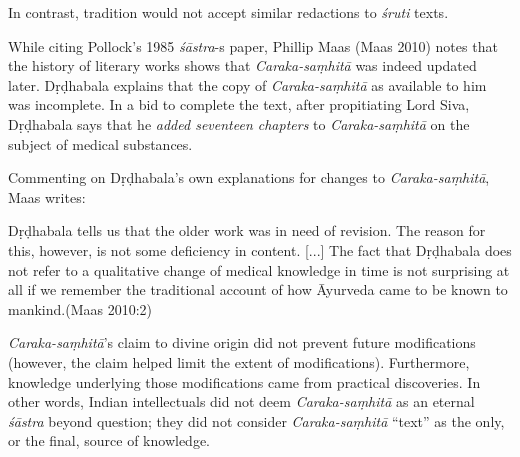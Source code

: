 In contrast, tradition would not accept similar redactions to {\sl śruti} texts.

While citing Pollock's 1985 {\sl śāstra}-s paper, Phillip Maas (Maas 2010) notes that the history of literary works shows that {\sl Caraka-saṃhitā} was indeed updated later.  Dṛḍhabala explains that the copy of {\sl Caraka-saṃhitā} as available to him was incomplete.  In a bid to complete the text, after propitiating Lord Siva, Dṛḍhabala says that he {\sl added seventeen chapters} to {\sl Caraka-saṃhitā} on the subject of medical substances.

Commenting on Dṛḍhabala's own explanations for changes to {\sl Caraka-saṃhitā}, Maas writes: 
\begin{myquote}
Dṛḍhabala tells us that the older work was in need of revision. The reason for this, however, is not some deficiency in content. [...] The fact that Dṛḍhabala does not refer to a qualitative change of medical knowledge in time is not surprising at all if we remember the traditional account of how Āyurveda came to be known to mankind.\hfill (Maas 2010:2)
\end{myquote}

{\sl Caraka-saṃhitā}'s claim to divine origin did not prevent future modifications (however, the claim helped limit the extent of modifications).  Furthermore, knowledge underlying those modifications came from practical discoveries.  In other words, Indian intellectuals did not deem {\sl Caraka-saṃhitā} as an eternal {\sl śāstra} beyond question; they did not consider {\sl Caraka-saṃhitā} ``text'' as the only, or the final, source of knowledge.

